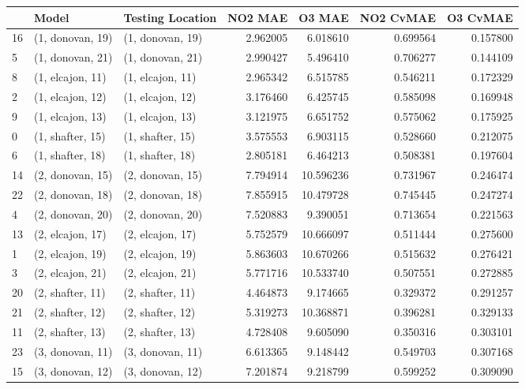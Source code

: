 \begin{tabular}{lllrrrr}
\toprule
{} &             Model &  Testing Location &   NO2 MAE &     O3 MAE &  NO2 CvMAE &  O3 CvMAE \\
\midrule
16 &  (1, donovan, 19) &  (1, donovan, 19) &  2.962005 &   6.018610 &   0.699564 &  0.157800 \\
5  &  (1, donovan, 21) &  (1, donovan, 21) &  2.990427 &   5.496410 &   0.706277 &  0.144109 \\
8  &  (1, elcajon, 11) &  (1, elcajon, 11) &  2.965342 &   6.515785 &   0.546211 &  0.172329 \\
2  &  (1, elcajon, 12) &  (1, elcajon, 12) &  3.176460 &   6.425745 &   0.585098 &  0.169948 \\
9  &  (1, elcajon, 13) &  (1, elcajon, 13) &  3.121975 &   6.651752 &   0.575062 &  0.175925 \\
0  &  (1, shafter, 15) &  (1, shafter, 15) &  3.575553 &   6.903115 &   0.528660 &  0.212075 \\
6  &  (1, shafter, 18) &  (1, shafter, 18) &  2.805181 &   6.464213 &   0.508381 &  0.197604 \\
14 &  (2, donovan, 15) &  (2, donovan, 15) &  7.794914 &  10.596236 &   0.731967 &  0.246474 \\
22 &  (2, donovan, 18) &  (2, donovan, 18) &  7.855915 &  10.479728 &   0.745445 &  0.247274 \\
4  &  (2, donovan, 20) &  (2, donovan, 20) &  7.520883 &   9.390051 &   0.713654 &  0.221563 \\
13 &  (2, elcajon, 17) &  (2, elcajon, 17) &  5.752579 &  10.666097 &   0.511444 &  0.275600 \\
1  &  (2, elcajon, 19) &  (2, elcajon, 19) &  5.863603 &  10.670266 &   0.515632 &  0.276421 \\
3  &  (2, elcajon, 21) &  (2, elcajon, 21) &  5.771716 &  10.533740 &   0.507551 &  0.272885 \\
20 &  (2, shafter, 11) &  (2, shafter, 11) &  4.464873 &   9.174665 &   0.329372 &  0.291257 \\
21 &  (2, shafter, 12) &  (2, shafter, 12) &  5.319273 &  10.368871 &   0.396281 &  0.329133 \\
11 &  (2, shafter, 13) &  (2, shafter, 13) &  4.728408 &   9.605090 &   0.350316 &  0.303101 \\
23 &  (3, donovan, 11) &  (3, donovan, 11) &  6.613365 &   9.148442 &   0.549703 &  0.307168 \\
15 &  (3, donovan, 12) &  (3, donovan, 12) &  7.201874 &   9.218799 &   0.599252 &  0.309090 \\

\end{tabular}
